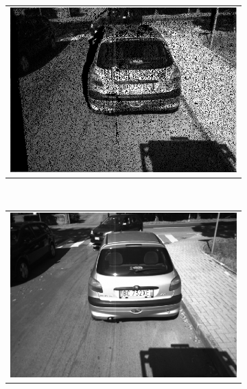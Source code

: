 \begin{figure}[h!]
        \centering
        \begin{subfigure}[b]{0.3\textwidth}
	  \begin{tabular}{c}
	    \includegraphics[width=\textwidth]{reprojection}
	  \end{tabular}
	  \caption{}\label{fig:cp03_lidarGTOriginal}
        \end{subfigure}%
        ~
        \begin{subfigure}[b]{0.3\textwidth}
	  \begin{tabular}{c}
	    \includegraphics[width=\textwidth]{leftNCC}
	  \end{tabular}
	  \caption{}\label{fig:cp03_lidarGT}
        \end{subfigure}%

\end{figure}

